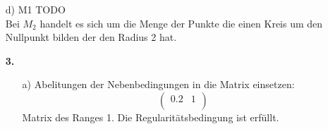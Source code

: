\documentclass[a4paper,11pt,fleqn]{scrartcl}
\begin{document}
\begin{enumerate}
        \item[d)]
            M1 TODO \\
            Bei $M_2$ handelt es sich um die Menge der Punkte die einen Kreis um den Nullpunkt bilden der den Radius 2 hat.
    \item[\textbf{3.}]
        \begin{enumerate}
            \item[a)]
                Abelitungen der Nebenbedingungen in die Matrix einsetzen:
                \[ 
                \begin{pmatrix}
                    0.2 & 1 \\
                \end{pmatrix}
                \]
                Matrix des Ranges 1. Die Regularitätsbedingung ist erfüllt.


\end{enumerate}
\end{enumerate}
\end{document}
